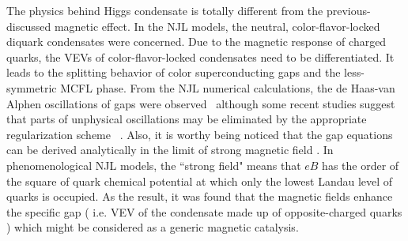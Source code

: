 \documentclass[12pt]{article}
\begin{document}
The physics behind Higgs condensate is totally different from the previous-discussed magnetic effect. In the NJL models, the neutral, color-flavor-locked diquark condensates were concerned. 
Due to the magnetic response of charged quarks, the VEVs of color-flavor-locked condensates need to be differentiated. It leads to the splitting behavior of color superconducting gaps and the less-symmetric MCFL phase. 
From the NJL numerical calculations, the de Haas-van Alphen oscillations of gaps were observed~\cite{ferrer2005magnetic,fukushima2008color} although some recent studies suggest that parts of
unphysical oscillations may be eliminated by the appropriate regularization scheme ~\cite{allen2015magnetized}.
Also, it is worthy being noticed that the gap equations can be derived analytically in the limit of strong magnetic field \cite{ferrer2006color,sen2015anisotropic}.
In phenomenological NJL models, the ``strong field" means that $eB$ has the order of the square of quark chemical potential at which
only the lowest Landau level of quarks is occupied.
As the result, it was found that the magnetic fields enhance the specific gap ( i.e. VEV of the condensate made up of opposite-charged quarks ) which might be considered as a generic magnetic catalysis.
\end{document}
